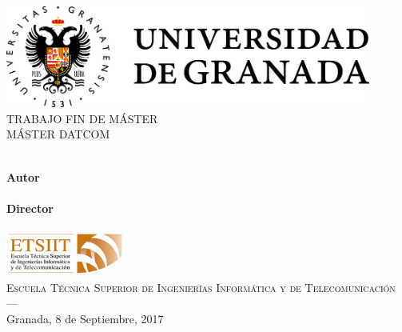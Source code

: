 \begin{titlepage}


\newlength{\centeroffset}
\setlength{\centeroffset}{-0.5\oddsidemargin}
\addtolength{\centeroffset}{0.5\evensidemargin}
\thispagestyle{empty}

\noindent\hspace*{\centeroffset}\begin{minipage}{\textwidth}

\centering
\includegraphics[width=0.9\textwidth]{imagenes/logo_ugr.png}\\[1.4cm]

\textsc{ \Large TRABAJO FIN DE MÁSTER\\[0.2cm]}
\textsc{
  MÁSTER DATCOM}\\[1cm]
%
{\Huge\bfseries \myTitle}\\
\end{minipage}

\vspace{2.5cm}
\noindent\hspace*{\centeroffset}\begin{minipage}{\textwidth}
\centering

\textbf{Autor}\\ {\myName} \\[2.5ex]
\textbf{Director} \\ {\myProf} \\[2cm]
\includegraphics[width=0.3\textwidth]{imagenes/etsiit_logo.png} \\[0.1cm]
\textsc{Escuela Técnica Superior de Ingenierías Informática y de Telecomunicación}\\
\textsc{---}\\
Granada, 8 de Septiembre, 2017
\end{minipage}
\end{titlepage}
